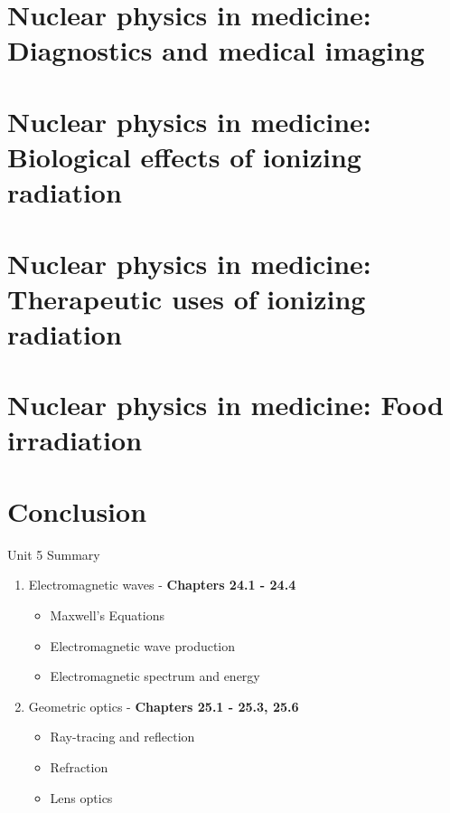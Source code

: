 \documentclass{beamer}
\begin{document}
\section{Nuclear physics in medicine: Diagnostics and medical imaging}

\section{Nuclear physics in medicine: Biological effects of ionizing radiation}

\section{Nuclear physics in medicine: Therapeutic uses of ionizing radiation}

\section{Nuclear physics in medicine: Food irradiation}

\section{Conclusion}

\begin{frame}{Unit 5 Summary}
\begin{enumerate}
\item Electromagnetic waves - \textbf{Chapters 24.1 - 24.4}
\begin{itemize}
\item Maxwell's Equations
\item Electromagnetic wave production
\item Electromagnetic spectrum and energy
\end{itemize}
\item Geometric optics - \textbf{Chapters 25.1 - 25.3, 25.6}
\begin{itemize}
\item Ray-tracing and reflection
\item Refraction
\item Lens optics
\end{itemize}
\end{enumerate}
\end{frame}
\end{document}
